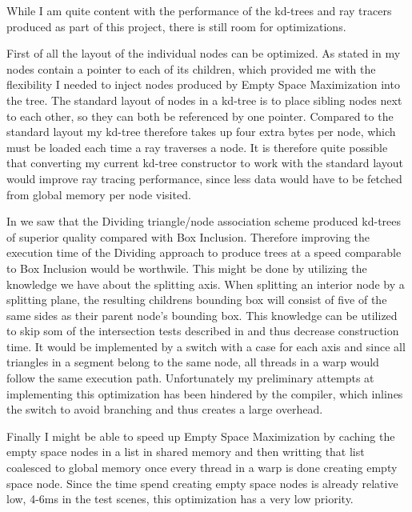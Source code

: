 While I am quite content with the performance of the kd-trees and ray tracers
produced as part of this project, there is still room for optimizations.


First of all the layout of the individual nodes can be optimized. As stated in
 my nodes contain a pointer to each of its
children, which provided me with the flexibility I needed to inject nodes
produced by Empty Space Maximization into the tree. The standard layout of nodes
in a kd-tree is to place sibling nodes next to each other, so they can both be
referenced by one pointer. Compared to the standard layout my kd-tree therefore
takes up four extra bytes per node, which must be loaded each time a ray
traverses a node. It is therefore quite possible that converting my current
kd-tree constructor to work with the standard layout would improve ray tracing
performance, since less data would have to be fetched from global memory per
node visited.



In  we saw that the Dividing triangle/node association
scheme produced kd-trees of superior quality compared with Box
Inclusion. Therefore improving the execution time of the Dividing approach to
produce trees at a speed comparable to Box Inclusion would be worthwile. This
might be done by utilizing the knowledge we have about the splitting axis. When
splitting an interior node by a splitting plane, the resulting childrens
bounding box will consist of five of the same sides as their parent node's
bounding box. This knowledge can be utilized to skip som of the intersection
tests described in  and thus decrease construction
time. It would be implemented by a switch with a case for each axis and since
all triangles in a segment belong to the same node, all threads in a warp would
follow the same execution path. Unfortunately my preliminary attempts at
implementing this optimization has been hindered by the compiler, which inlines
the switch to avoid branching and thus creates a large overhead.


Finally I might be able to speed up Empty Space Maximization by caching the
empty space nodes in a list in shared memory and then writting that list
coalesced to global memory once every thread in a warp is done creating empty
space node. Since the time spend creating empty space nodes is already relative
low, 4-6ms in the test scenes, this optimization has a very low priority.







